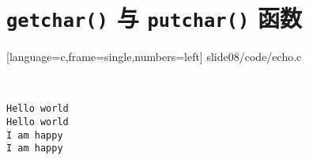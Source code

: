 \section{ \lstinline|getchar()| 与 \lstinline|putchar()| 函数}

\begin{frame}[fragile]\ft{\secname}
  \begin{minipage}{0.65\textwidth}
    
    [language=c,frame=single,numbers=left]
    {slide08/code/echo.c}    
  \end{minipage}~~\pause 
  \begin{minipage}{0.3\textwidth}
    \begin{lstlisting}[backgroundcolor=\color{blue!20}]
Hello world 
Hello world
I am happy
I am happy
\end{lstlisting}    
  \end{minipage}
\end{frame}
